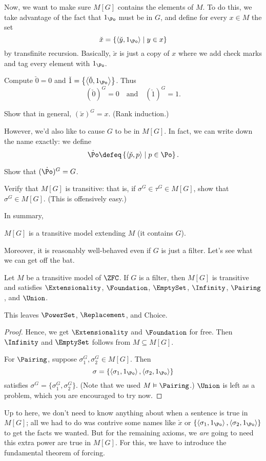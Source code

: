 Now, we want to make sure $M[G]$ contains the elements of $M$.
To do this, we take advantage of the fact that $1_\Po$ must be in $G$, and define
for every $x \in M$ the set
\[ \check x = \left\{ \left<\check y, 1_\Po\right> \mid y \in x \right\} \]
by transfinite recursion.
Basically, $\check x$ is just a copy of $x$ where we add check marks and tag every element with $1_\Po$.

\begin{example}
	Compute $\check 0 = 0$ and $\check 1 = \left\{ \left<\check 0, 1_\Po\right> \right\}$.
	Thus \[ (\check 0)^G = 0 \quad\text{and}\quad (\check 1)^G = 1. \]
\end{example}
\begin{ques}
	Show that in general, $(\check x)^G = x$.
	(Rank induction.)
\end{ques}

However, we'd also like to cause $G$ to be in $M[G]$.
In fact, we can write down the name exactly: we define
\[ \dot \Po \defeq \left\{ \left<\check p, p\right> \mid p \in \Po \right\}. \]
\begin{ques}
	Show that $(\dot \Po)^G = G$.
\end{ques}
\begin{ques}
	Verify that $M[G]$ is transitive:
	that is, if $\sigma^G \in \tau^G \in M[G]$, show that $\sigma^G \in M[G]$.
	(This is offensively easy.)
\end{ques}

In summary,
\begin{moral}
	$M[G]$ is a transitive model extending $M$ (it contains $G$).
\end{moral}

Moreover, it is reasonably well-behaved even if $G$ is just a filter.
Let's see what we can get off the bat.
\begin{lemma}
	Let $M$ be a transitive model of $\ZFC$.
	If $G$ is a filter, then $M[G]$ is transitive
	and satisfies $\Extensionality$, $\Foundation$,
	$\EmptySet$, $\Infinity$, $\Pairing$, and $\Union$.
\end{lemma}

This leaves $\PowerSet$, $\Replacement$, and Choice.
\begin{proof}
	Hence, we get $\Extensionality$ and $\Foundation$ for free.
	Then $\Infinity$ and $\EmptySet$ follows from $M \subseteq M[G]$.

	For $\Pairing$, suppose $\sigma_1^G, \sigma_2^G \in M[G]$.
	Then
	\[ \sigma =
		\left\{ \left<\sigma_1, 1_\Po\right>, \left<\sigma_2, 1_\Po\right> \right\}
	\]
	satisfies $\sigma^G = \{\sigma_1^G, \sigma_2^G\}$.
	(Note that we used $M \vDash \Pairing$.)
	$\Union$ is left as a problem, which you are encouraged to try now.
\end{proof}
Up to here, we don't need to know anything about when a sentence is true in $M[G]$;
all we had to do was contrive some names like $\check x$ or
$\left\{ \left<\sigma_1, 1_\Po\right>, \left<\sigma_2, 1_\Po\right> \right\}$
to get the facts we wanted.
But for the remaining axioms, we \emph{are} going to need this extra power
are true in $M[G]$.
For this, we have to introduce the fundamental theorem of forcing.

